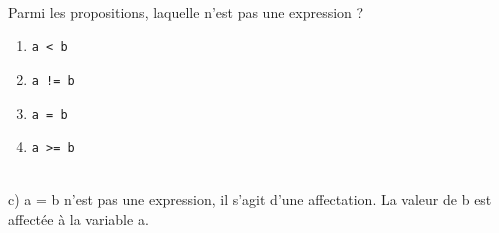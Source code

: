 \documentclass[a4paper,12pt]{article}
\begin{document}
\exo{}  ~\\ 
Parmi les propositions, laquelle n'est pas une expression ?
\begin{multicols}{2}
	\begin{enumerate}[label=\alph*)]
		\item \lstinline{a < b}
		\item \lstinline{a != b}
		\item \lstinline{a = b}
		\item \lstinline{a >= b}
	\end{enumerate}
\end{multicols}
\begin{correction}
	~\\ 
	c) a = b n'est pas une expression, il s'agit d'une affectation. La valeur de b est affectée à la variable a.
\end{correction}
\finexo
\end{document}
